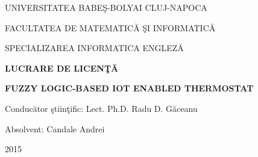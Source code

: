 \documentclass[a4paper, 12pt, english]{report}
\begin{document}
\begin{titlepage}
\sloppy
\begin{center}
\Large{UNIVERSITATEA BABE\c{S}-BOLYAI CLUJ-NAPOCA}

\Large{FACULTATEA DE MATEMATIC\u{A} \c{S}I INFORMATIC\u{A} }

\Large{SPECIALIZAREA INFORMATICA ENGLEZ\u{A}}



\vspace{7cm}

\Large \textbf{LUCRARE DE LICEN\c{T}\u{A} }

\vspace{1.3cm}

\Huge \textbf{FUZZY LOGIC-BASED IOT ENABLED THERMOSTAT}

\end{center}
\vspace{4cm}

\begin{flushleft}
    \Large{Conduc\u{a}tor \c{s}tiin\c{t}ific: Lect. Ph.D. Radu D. G\u{a}ceanu}
\end{flushleft}

\vspace{1cm}

\begin{flushright}
\Large{Absolvent: Candale Andrei}

\end{flushright}

\vspace{1cm}

\begin{center}
\Large{2015}
\end{center}

\end{titlepage}




\tableofcontents
\listoffigures
\listoftables
















\renewcommand\bibname{Bibliography}

%
%


\end{document}

